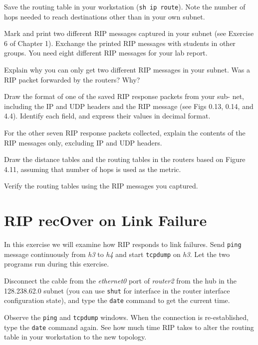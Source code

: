 \documentclass{../UTNetLab}
\begin{document}
    Save the routing table in your workstation (\lstinline{sh ip route}).
    Note the number of hops needed to reach destinations other than in your own subnet.

    Mark and print two different RIP messages captured in your subnet (see Exercise 6 of Chapter 1).
    Exchange the printed RIP messages with students in other groups.
    You need eight different RIP messages for your lab report.
    
    \begin{report}
    \item Explain why you can only get two different RIP messages in your subnet.
    Was a RIP packet forwarded by the routers?
    Why?
    
    \item Draw the format of one of the saved RIP response packets from your sub- net, including the IP and UDP headers and the RIP message (see Figs 0.13, 0.14, and 4.4). Identify each field, and express their values in decimal format.
    
    \item For the other seven RIP response packets collected, explain the contents of the RIP messages only, excluding IP and UDP headers.

    
    \item Draw the distance tables and the routing tables in the routers based on Figure 4.11, assuming that number of hops is used as the metric.

    \item Verify the routing tables using the RIP messages you captured.
    \end{report}


\section{RIP recOver on Link Failure}
    In this exercise we will examine how RIP responds to link failures.
    Send \lstinline{ping} message continuously from \textit{h3} to \textit{h4} and start \lstinline{tcpdump} on \textit{h3}.
    Let the two programs run during this exercise.

    Disconnect the cable from the \textit{ethernet0} port of \textit{router2} from the hub in the 128.238.62.0 subnet (you can use \lstinline[language={cisco}]{shut} for interface in the router interface configuration state), and type the \lstinline{date} command to get the current time.

    Observe the \lstinline{ping} and \lstinline{tcpdump} windows.
    When the connection is re-established, type the \lstinline{date} command again.
    See how much time RIP takes to alter the routing table in your workstation to the new topology.
\end{document}
